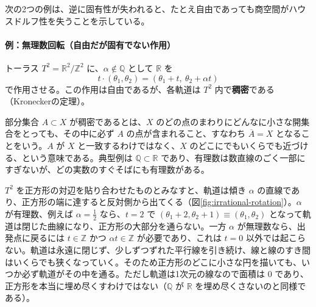 \documentclass[uplatex, dvipdfmx, book]{jsbook}
\begin{document}
次の2つの例は、逆に固有性が失われると、たとえ自由であっても商空間がハウスドルフ性を失うことを示している。

\paragraph{例：無理数回転（自由だが固有でない作用）}
トーラス $T^2 = \mathbb{R}^2/\mathbb{Z}^2$ に、$\alpha \notin \mathbb{Q}$ として $\mathbb{R}$ を
\begin{equation}
    t \cdot (\theta_1, \theta_2) = (\theta_1 + t,\ \theta_2 + \alpha t)
\end{equation}
で作用させる。この作用は自由であるが、各軌道は $T^2$ 内で\textbf{稠密}である（Kroneckerの定理）。

部分集合 $A \subset X$ が稠密であるとは、$X$ のどの点のまわりにどんなに小さな開集合をとっても、その中に必ず $A$ の点が含まれること、すなわち $\overline{A} = X$ となることをいう。$A$ が $X$ と一致するわけではなく、$X$ のどこにでもいくらでも近づける、という意味である。典型例は $\mathbb{Q} \subset \mathbb{R}$ であり、有理数は数直線のごく一部にすぎないが、どの実数のすぐそばにも有理数がある。

$T^2$ を正方形の対辺を貼り合わせたものとみなすと、軌道は傾き $\alpha$ の直線であり、正方形の端に達すると反対側から出てくる（図\ref{fig:irrational-rotation}）。$\alpha$ が有理数、例えば $\alpha = \frac12$ なら、$t = 2$ で $(\theta_1 + 2, \theta_2 + 1) \equiv (\theta_1, \theta_2)$ となって軌道は閉じた曲線になり、正方形の大部分を通らない。一方 $\alpha$ が無理数なら、出発点に戻るには $t \in \mathbb{Z}$ かつ $\alpha t \in \mathbb{Z}$ が必要であり、これは $t = 0$ 以外では起こらない。軌道は永遠に閉じず、少しずつずれた平行線を引き続け、線と線のすき間はいくらでも狭くなっていく。そのため正方形のどこに小さな円を描いても、いつか必ず軌道がその中を通る。ただし軌道は1次元の線なので面積は $0$ であり、正方形を本当に埋め尽くすわけではない（$\mathbb{Q}$ が $\mathbb{R}$ を埋め尽くさないのと同様である）。
\end{document}
